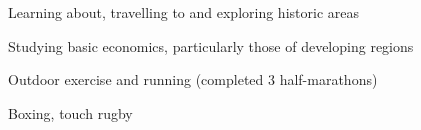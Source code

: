 \documentclass[11pt,a4paper]{awesome-cv}        %
\begin{document}

\begin{cventries}

  \cventry
  {
  }
  {}
  {}
  {}
  {
    \begin{cvitems}
      \item Learning about, travelling to and exploring historic areas
      \item Studying basic economics, particularly those of developing regions
      \item Outdoor exercise and running (completed 3 half-marathons)
      \item Boxing, touch rugby
    \end{cvitems}
  }
\end{cventries}
\end{document}

